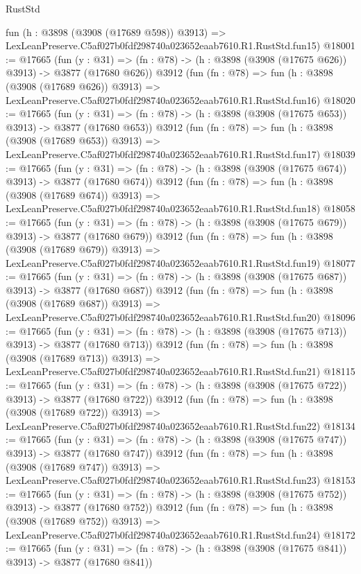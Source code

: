 \begin{lexlean}{RustStd}
\begin{coremodule}
    fun (h : @3898 (@3908 (@17689 @598)) @3913) =>
    LexLeanPreserve.C5af027b0fdf298740a023652eaab7610.R1.RustStd.fun15)
@18001 := @17665
    (fun (y : @31) => (fn : @78) -> (h : @3898 (@3908 (@17675 @626)) @3913) -> @3877 (@17680 @626))
    @3912
    (fun (fn : @78) =>
    fun (h : @3898 (@3908 (@17689 @626)) @3913) =>
    LexLeanPreserve.C5af027b0fdf298740a023652eaab7610.R1.RustStd.fun16)
@18020 := @17665
    (fun (y : @31) => (fn : @78) -> (h : @3898 (@3908 (@17675 @653)) @3913) -> @3877 (@17680 @653))
    @3912
    (fun (fn : @78) =>
    fun (h : @3898 (@3908 (@17689 @653)) @3913) =>
    LexLeanPreserve.C5af027b0fdf298740a023652eaab7610.R1.RustStd.fun17)
@18039 := @17665
    (fun (y : @31) => (fn : @78) -> (h : @3898 (@3908 (@17675 @674)) @3913) -> @3877 (@17680 @674))
    @3912
    (fun (fn : @78) =>
    fun (h : @3898 (@3908 (@17689 @674)) @3913) =>
    LexLeanPreserve.C5af027b0fdf298740a023652eaab7610.R1.RustStd.fun18)
@18058 := @17665
    (fun (y : @31) => (fn : @78) -> (h : @3898 (@3908 (@17675 @679)) @3913) -> @3877 (@17680 @679))
    @3912
    (fun (fn : @78) =>
    fun (h : @3898 (@3908 (@17689 @679)) @3913) =>
    LexLeanPreserve.C5af027b0fdf298740a023652eaab7610.R1.RustStd.fun19)
@18077 := @17665
    (fun (y : @31) => (fn : @78) -> (h : @3898 (@3908 (@17675 @687)) @3913) -> @3877 (@17680 @687))
    @3912
    (fun (fn : @78) =>
    fun (h : @3898 (@3908 (@17689 @687)) @3913) =>
    LexLeanPreserve.C5af027b0fdf298740a023652eaab7610.R1.RustStd.fun20)
@18096 := @17665
    (fun (y : @31) => (fn : @78) -> (h : @3898 (@3908 (@17675 @713)) @3913) -> @3877 (@17680 @713))
    @3912
    (fun (fn : @78) =>
    fun (h : @3898 (@3908 (@17689 @713)) @3913) =>
    LexLeanPreserve.C5af027b0fdf298740a023652eaab7610.R1.RustStd.fun21)
@18115 := @17665
    (fun (y : @31) => (fn : @78) -> (h : @3898 (@3908 (@17675 @722)) @3913) -> @3877 (@17680 @722))
    @3912
    (fun (fn : @78) =>
    fun (h : @3898 (@3908 (@17689 @722)) @3913) =>
    LexLeanPreserve.C5af027b0fdf298740a023652eaab7610.R1.RustStd.fun22)
@18134 := @17665
    (fun (y : @31) => (fn : @78) -> (h : @3898 (@3908 (@17675 @747)) @3913) -> @3877 (@17680 @747))
    @3912
    (fun (fn : @78) =>
    fun (h : @3898 (@3908 (@17689 @747)) @3913) =>
    LexLeanPreserve.C5af027b0fdf298740a023652eaab7610.R1.RustStd.fun23)
@18153 := @17665
    (fun (y : @31) => (fn : @78) -> (h : @3898 (@3908 (@17675 @752)) @3913) -> @3877 (@17680 @752))
    @3912
    (fun (fn : @78) =>
    fun (h : @3898 (@3908 (@17689 @752)) @3913) =>
    LexLeanPreserve.C5af027b0fdf298740a023652eaab7610.R1.RustStd.fun24)
@18172 := @17665
    (fun (y : @31) => (fn : @78) -> (h : @3898 (@3908 (@17675 @841)) @3913) -> @3877 (@17680 @841))

\end{coremodule}
\end{lexlean}
